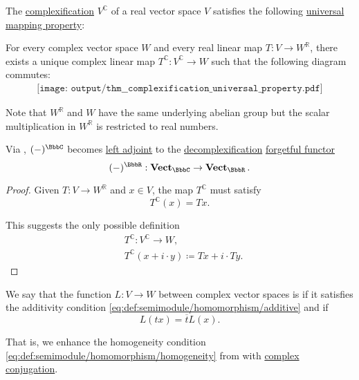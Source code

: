 \begin{theorem}\label{thm:complexification_universal_property}
  The \hyperref[def:complexification]{complexification} \( V^\BbbC \) of a real vector space \( V \) satisfies the following \hyperref[rem:universal_mapping_property]{universal mapping property}:
  \begin{displayquote}
    For every complex vector space \( W \) and every real linear map \( T: V \to W^\BbbR \), there exists a unique complex linear map \( T^\BbbC: V^\BbbC \to W \) such that the following diagram commutes:
    \begin{equation}\label{eq:thm:complexification_universal_property/diagram}
      \begin{aligned}
        \texttt{[image: output/thm\_\_complexification\_universal\_property.pdf]}
      \end{aligned}
    \end{equation}
  \end{displayquote}

  Note that \( W^\BbbR \) and \( W \) have the same underlying abelian group but the scalar multiplication in \( W^\BbbR \) is restricted to real numbers.

  Via , \( (\anon*)^\BbbC \) becomes \hyperref[def:category_adjunction]{left adjoint} to the \hyperref[def:complexification]{decomplexification} \hyperref[def:concrete_category]{forgetful functor}
  \begin{equation*}
    (\anon*)^\BbbR: \cat{Vect}_\BbbC \to \cat{Vect}_\BbbR.
  \end{equation*}
\end{theorem}
\begin{proof}
  Given \( T: V \to W^\BbbR \) and \( x \in V \), the map \( T^\BbbC \) must satisfy
  \begin{equation*}
    T^\BbbC(x) = Tx.
  \end{equation*}

  This suggests the only possible definition
  \begin{equation*}
    \begin{aligned}
      &T^\BbbC: V^\BbbC \to W, \\
      &T^\BbbC(x + i \cdot y) \coloneqq Tx + i \cdot Ty.
    \end{aligned}
  \end{equation*}
\end{proof}

\begin{definition}\label{def:antilinear_function}\mimprovised
  We say that the function \( L: V \to W \) between complex vector spaces is  if it satisfies the additivity condition \eqref{eq:def:semimodule/homomorphism/additive} and if
  \begin{equation}\label{eq:def:antilinear_function}
    L(tx) = \overline t L(x).
  \end{equation}

  That is, we enhance the homogeneity condition \eqref{eq:def:semimodule/homomorphism/homogeneity} from  with \hyperref[def:complex_numbers]{complex conjugation}.
\end{definition}

